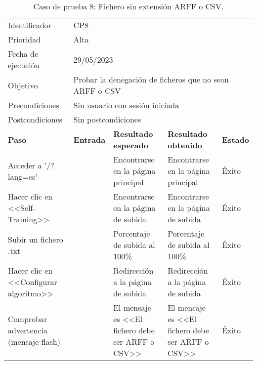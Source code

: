 \begin{table}[H]
\begin{tabular}{p{}p{}p{}p{}p{}}
\rowcolor{gray!25}
Identificador   & \multicolumn{4}{l}{CP8}                                                   \\
Prioridad   & \multicolumn{4}{l}{Alta}                                                    \\
\rowcolor{gray!25}
Fecha de ejecución   & \multicolumn{4}{l}{29/05/2023}                                                    \\
Objetivo        & \multicolumn{4}{p{0.80\textwidth}}{Probar la denegación de ficheros que no sean ARFF o CSV}                                                     \\
\rowcolor{gray!25}
Precondiciones  & \multicolumn{4}{l}{Sin usuario con sesión iniciada}                                                     \\
Postcondiciones & \multicolumn{4}{l}{Sin postcondiciones}                                                     \\ \hline
\rowcolor{gray!25}
\textbf{Paso}   & \textbf{Entrada} & \textbf{Resultado esperado} & \textbf{Resultado obtenido} & \textbf{Estado} \\ \hline
Acceder a '/?lang=es'                                 &                        & Encontrarse en la página principal                                   & Encontrarse en la página principal                                   & Éxito  \\ \hline
Hacer clic en <<Self-Training>>                       &                        & Encontrarse en la página de subida                                   & Encontrarse en la página de subida                                & Éxito                            \\ \hline
Subir un fichero .txt                                 &                        & Porcentaje de subida al 100\%                                        & Porcentaje de subida al 100\%                                & Éxito                            \\ \hline
Hacer clic en <<Configurar algoritmo>>                &                        & Redirección a la página de subida                                    & Redirección a la página de subida                                 & Éxito                            \\ \hline
Comprobar advertencia (mensaje flash)                 &                        & El mensaje es <<El fichero debe ser ARFF o CSV>>                     & El mensaje es <<El fichero debe ser ARFF o CSV>>                                 & Éxito  \\ \hline 
\end{tabular}
\caption{Caso de prueba 8: Fichero sin extensión ARFF o CSV.}
\end{table}

